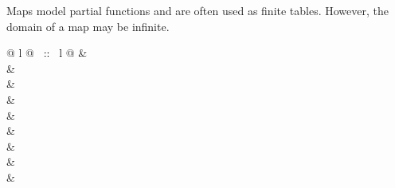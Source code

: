 \begin{isabellebody}
\begin{isamarkuptext}
Maps model partial functions and are often used as finite tables. However,
the domain of a map may be infinite.

\bigskip

\begin{supertabular}{@ {} l @ {~::~} l @ {}}
 & \\
 & \\
 & \\
 & \\
 & \\
 & \\
 & \\
 & \\
 & \\
\end{supertabular}


\end{isamarkuptext}
\end{isabellebody}
